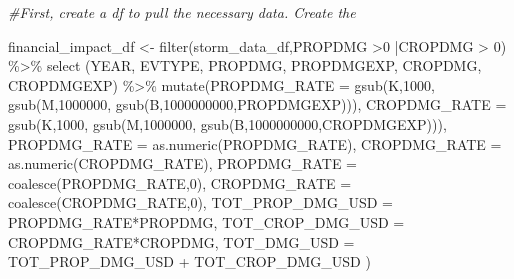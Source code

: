 \documentclass[
]{article}
\newenvironment{Shaded}{\begin{snugshade}}{\end{snugshade}}
\newcommand{\AttributeTok}[1]{\textcolor[rgb]{0.77,0.63,0.00}{#1}}
\newcommand{\CommentTok}[1]{\textcolor[rgb]{0.56,0.35,0.01}{\textit{#1}}}
\newcommand{\DecValTok}[1]{\textcolor[rgb]{0.00,0.00,0.81}{#1}}
\newcommand{\FunctionTok}[1]{\textcolor[rgb]{0.00,0.00,0.00}{#1}}
\newcommand{\NormalTok}[1]{#1}
\newcommand{\OtherTok}[1]{\textcolor[rgb]{0.56,0.35,0.01}{#1}}
\newcommand{\SpecialCharTok}[1]{\textcolor[rgb]{0.00,0.00,0.00}{#1}}
\newcommand{\StringTok}[1]{\textcolor[rgb]{0.31,0.60,0.02}{#1}}
\begin{document}
\begin{Shaded}
\begin{Highlighting}[]
\CommentTok{\#First, create a df to pull the necessary data. Create the }


\NormalTok{financial\_impact\_df }\OtherTok{\textless{}{-}} \FunctionTok{filter}\NormalTok{(storm\_data\_df,PROPDMG }\SpecialCharTok{\textgreater{}}\DecValTok{0} \SpecialCharTok{|}\NormalTok{CROPDMG }\SpecialCharTok{\textgreater{}} \DecValTok{0}\NormalTok{) }\SpecialCharTok{\%\textgreater{}\%}
      \FunctionTok{select}\NormalTok{ (YEAR, EVTYPE, PROPDMG, PROPDMGEXP, CROPDMG, CROPDMGEXP) }\SpecialCharTok{\%\textgreater{}\%}
        \FunctionTok{mutate}\NormalTok{(}\AttributeTok{PROPDMG\_RATE =}   \FunctionTok{gsub}\NormalTok{(}\StringTok{\textquotesingle{}K\textquotesingle{}}\NormalTok{,}\DecValTok{1000}\NormalTok{,}
                                \FunctionTok{gsub}\NormalTok{(}\StringTok{\textquotesingle{}M\textquotesingle{}}\NormalTok{,}\DecValTok{1000000}\NormalTok{,}
                                \FunctionTok{gsub}\NormalTok{(}\StringTok{\textquotesingle{}B\textquotesingle{}}\NormalTok{,}\DecValTok{1000000000}\NormalTok{,PROPDMGEXP))),}
               \AttributeTok{CROPDMG\_RATE =}   \FunctionTok{gsub}\NormalTok{(}\StringTok{\textquotesingle{}K\textquotesingle{}}\NormalTok{,}\DecValTok{1000}\NormalTok{,}
                                \FunctionTok{gsub}\NormalTok{(}\StringTok{\textquotesingle{}M\textquotesingle{}}\NormalTok{,}\DecValTok{1000000}\NormalTok{,}
                                \FunctionTok{gsub}\NormalTok{(}\StringTok{\textquotesingle{}B\textquotesingle{}}\NormalTok{,}\DecValTok{1000000000}\NormalTok{,CROPDMGEXP))),}
               \AttributeTok{PROPDMG\_RATE =} \FunctionTok{as.numeric}\NormalTok{(PROPDMG\_RATE),}
               \AttributeTok{CROPDMG\_RATE =} \FunctionTok{as.numeric}\NormalTok{(CROPDMG\_RATE),}
               \AttributeTok{PROPDMG\_RATE =} \FunctionTok{coalesce}\NormalTok{(PROPDMG\_RATE,}\DecValTok{0}\NormalTok{),}
               \AttributeTok{CROPDMG\_RATE =} \FunctionTok{coalesce}\NormalTok{(CROPDMG\_RATE,}\DecValTok{0}\NormalTok{),}
               \AttributeTok{TOT\_PROP\_DMG\_USD =}\NormalTok{ PROPDMG\_RATE}\SpecialCharTok{*}\NormalTok{PROPDMG,}
               \AttributeTok{TOT\_CROP\_DMG\_USD =}\NormalTok{ CROPDMG\_RATE}\SpecialCharTok{*}\NormalTok{CROPDMG,}
               \AttributeTok{TOT\_DMG\_USD =}\NormalTok{ TOT\_PROP\_DMG\_USD }\SpecialCharTok{+}\NormalTok{ TOT\_CROP\_DMG\_USD}
\NormalTok{               )}
\end{Highlighting}
\end{Shaded}
\end{document}
